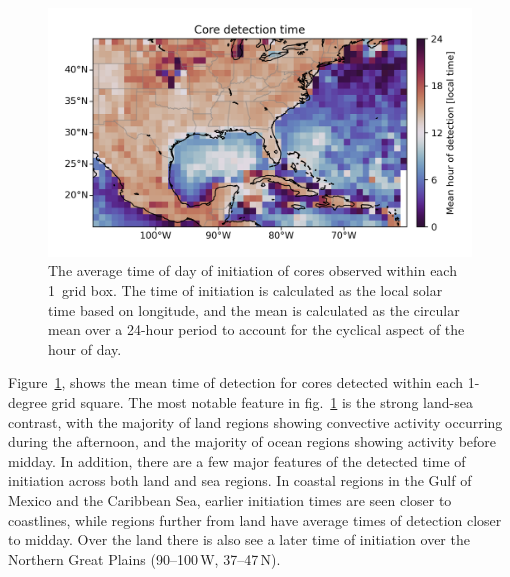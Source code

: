 \begin{figure}[tp]
    \centering
    \includegraphics[width=\textwidth]{figures/chapter2_11.png}
    \caption[
    A map of average time of day of initiation of detected cores
    ]{
    The average time of day of initiation of cores observed within each 1\textdegree\ grid box. The time of initiation is calculated as the local solar time based on longitude, and the mean is calculated as the circular mean over a 24-hour period to account for the cyclical aspect of the hour of day.
    }
    \label{fig:core_detection_time_map}
\end{figure}

Figure~\ref{fig:core_detection_time_map}, shows the mean time of detection for cores detected within each 1-degree grid square.
The most notable feature in fig.~\ref{fig:core_detection_time_map} is the strong land-sea contrast, with the majority of land regions showing convective activity occurring during the afternoon, and the majority of ocean regions showing activity before midday.
In addition, there are a few major features of the detected time of initiation across both land and sea regions.
In coastal regions in the Gulf of Mexico and the Caribbean Sea, earlier initiation times are seen closer to coastlines, while regions further from land have average times of detection closer to midday.
Over the land there is also see a later time of initiation over the Northern Great Plains (90--100\,\textdegree W, 37--47\,\textdegree N).



